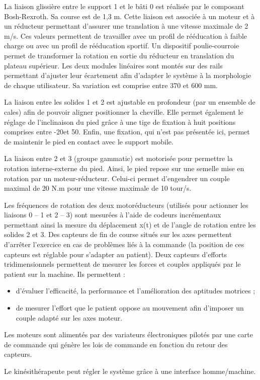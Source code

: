 \documentclass[10pt]{article}
\begin{document}
La liaison glissière entre le support 1 et le bâti 0 est réalisée par le composant Bosh-Rexroth. Sa course est de 1,3 m. Cette liaison est associée à un moteur et à un réducteur permettant d’assurer une translation à une vitesse maximale de 2 m/s. Ces valeurs permettent de travailler avec un profil de rééducation à faible charge ou avec un profil de rééducation sportif. Un dispositif poulie-courroie permet de transformer la rotation en sortie du réducteur en translation du plateau supérieur. Les deux modules linéaires sont montés sur des rails permettant d’ajuster leur écartement afin d’adapter le système à la morphologie de chaque utilisateur. Sa variation est comprise entre 370 et 600 mm.

La liaison entre les solides 1 et 2 est ajustable en profondeur (par un ensemble de cales) afin de pouvoir aligner positionner la cheville. Elle permet également le réglage de l’inclinaison du pied grâce à une tige de fixation à huit positions comprises entre -20\textdegree et 50\textdegree. Enfin, une fixation, qui n’est pas présentée ici, permet de maintenir le pied en contact avec le support mobile.

La liaison entre 2 et 3 (groupe gammatic) est motorisée pour permettre la rotation interne-externe du pied. Ainsi, le pied repose sur une semelle mise en rotation par un moteur-réducteur. Celui-ci permet d’engendrer un couple maximal de 20 N.m pour une vitesse maximale de 10 tour/s. 

Les fréquences de rotation des deux motoréducteurs (utilisés pour actionner les liaisons 0 – 1 et 2 – 3) sont mesurées à l'aide de codeurs incrémentaux permettant ainsi la mesure du déplacement x(t) et de l’angle de rotation entre les solides 2 et 3. Des capteurs de fin de course situés sur les axes permettent d'arrêter l'exercice en cas de problèmes liés à la commande (la position de ces capteurs est réglable pour s'adapter au patient). Deux capteurs d'efforts tridimensionnels permettent de mesurer les forces et couples appliqués par le patient sur la machine. Ils permettent :
\begin{itemize}
\item d'évaluer l'efficacité, la performance et l'amélioration des aptitudes motrices ;
\item de mesurer l'effort que le patient oppose au mouvement afin d'imposer un couple adapté sur les axes moteur.
\end{itemize}
Les moteurs sont alimentés par des variateurs électroniques pilotés par une carte de commande qui génère les lois de commande en fonction du retour des capteurs.

Le kinésithérapeute peut régler le système grâce à une interface homme/machine.
\end{document}
